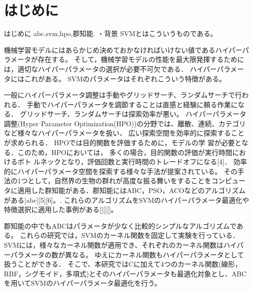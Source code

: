 \section{はじめに}
はじめに
abc.svm,hpo,郡知能.
・背景
SVMとはこういうものである。

機械学習モデルにはあらかじめ決めておかなければいけない値であるハイパーパラメータが存在する。
そして，機械学習モデルの性能を最大限発揮するためには，適切なハイパーパラメータの選択が必要不可欠である\cite{essential}．
ハイパーパラメータにはこれがある。
SVMのパラメータはそれぞれこういう特徴がある。

一般にハイパーパラメータ調整は手動やグリッドサーチ、ランダムサーチで行われる．
手動でハイパーパラメータを調節することは直感と経験に頼る作業になる．
グリッドサーチ、ランダムサーチは探索効率が悪い。
ハイパーパラメータ調整(Hyper Parameter Optimization(HPO))の分野では、離散、連続、カテゴリなど様々なハイパーパラメータを扱い、
広い探索空間を効率的に探索することが求められる．
HPOでは目的関数を評価するために，モデルの学
習が必要となる．このため，HPOにおいては，
多くの場合，目的関数の評価が実行時間におけるボト
ルネックとなり，評価回数と実行時間のトレードオフになる[4]．
 効率的にハイパーパラメータ空間を探索する様々な手法が提案されている。
その手法の1つとして，自然界の生物の群れが高度な振る舞いをすることをコンピュータに適用した群知能がある．郡知能にはABC，PSO，ACOなどのアルゴリズムがある[abc][5][6]。.
これらのアルゴリズムをSVMのハイパーパラメータ最適化や特徴選択に適用した事例がある[][][]。

郡知能の中でもABCはパラメータが少なく比較的シンプルなアルゴリズムである。
これらの研究では，SVMのカーネル関数を固定して実験を行っている．
SVMには，様々なカーネル関数が適用でき、それぞれのカーネル関数はハイパーパラメータの数が異なる。
ゆえにカーネル関数もハイパーパラメータとして扱うことができる．
そこで、本研究ではCに加えて4つのカーネル関数(線形，RBF，シグモイド，多項式)とそのハイパーパラメータも最適化対象とし、ABCを用いてSVMのハイパーパラメータ最適化を行う。


